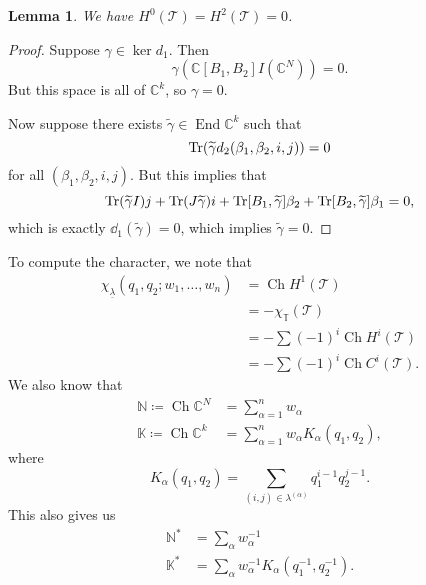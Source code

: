 \documentclass[leqno, openany]{memoir}
\newtheorem{lem}[thm]{Lemma}
\theoremstyle{definition}
\theoremstyle{remark}
\theoremstyle{plain}
\theoremstyle{definition}
\theoremstyle{remark}
\newcommand{\N}{\mathbb{N}}
\newcommand{\C}{\mathbb{C}}
\newcommand{\mc}[1]{\mathcal{#1}}
\newcommand{\T}{\mathbb{T}}
\newcommand{\on}[1]{\operatorname{#1}}
\newcommand{\ul}[1]{\underline{#1}}
\newcommand{\wt}[1]{\widetilde{#1}}
\DeclareMathOperator{\End}{End}
\begin{document}
\begin{lem}
    We have $H^0(\mc{T}) = H^2(\mc{T}) = 0$.
\end{lem}

\begin{proof}
    Suppose $\gamma \in \ker d_1$. Then 
    \[ \gamma (\C[B_1, B_2] I(\C^N)) = 0. \]
    But this space is all of $\C^k$, so $\gamma = 0$.

    Now suppose there exists $\wt{\gamma} \in \End \C^k$ such that
    \[ \Tr (\wt{\gamma} d_2(\beta_1, \beta_2, i,j)) = 0 \]
    for all $(\beta_1, \beta_2, i, j)$. But this implies that
    \[ \Tr (\wt{\gamma} I)j + \Tr (J \wt{\gamma}) i + \Tr [B_1, \wt{\gamma}] \beta_2 + \Tr [B_2, \wt{\gamma}] \beta_1 = 0, \]
    which is exactly $\dd_1(\wt{\gamma}) = 0$, which implies $\wt{\gamma} = 0$.
\end{proof}

To compute the character, we note that
\begin{align*}
    \chi_{\ul{\lambda}}(q_1, q_2; w_1, \ldots, w_n) &= \on{Ch} H^1(\mc{T}) \\
    &= - \chi_{\T}(\mc{T}) \\
    &= - \sum (-1)^i \on{Ch} H^i(\mc{T}) \\
    &= - \sum (-1)^i \on{Ch} C^i(\mc{T}).
\end{align*}
We also know that
\begin{align*}
    \N \coloneqq \on{Ch} \C^N &= \sum_{\alpha = 1}^n w_{\alpha} \\
    \mathbb{K} \coloneqq \on{Ch} \C^k &= \sum_{\alpha=1}^n w_{\alpha} K_{\alpha}(q_1, q_2),
\end{align*}
where
\[ K_{\alpha}(q_1, q_2) = \sum_{(i,j) \in \lambda^{(\alpha)}} q_1^{i-1} q_2^{j-1}. \]
This also gives us
\begin{align*}
    \N^* &= \sum_{\alpha} w_{\alpha}^{-1} \\
    \mathbb{K}^* &= \sum_{\alpha} w_{\alpha}^{-1} K_{\alpha}(q_1^{-1}, q_2^{-1}).
\end{align*}
\end{document}
